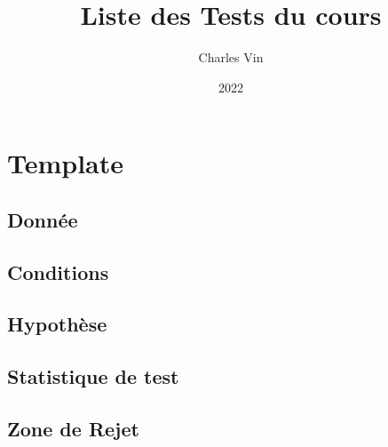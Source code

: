 \documentclass{article}
\title{Liste des Tests du cours}
\author{Charles Vin}
\date{2022}
\theoremstyle{plain}%
\theoremstyle{definition}
\theoremstyle{remark}
\begin{document}
\maketitle
\tableofcontents

\section{Template}
\subsection*{Donnée}
\subsection*{Conditions}
\subsection*{Hypothèse}
\subsection*{Statistique de test}
\subsection*{Zone de Rejet}
\end{document}
